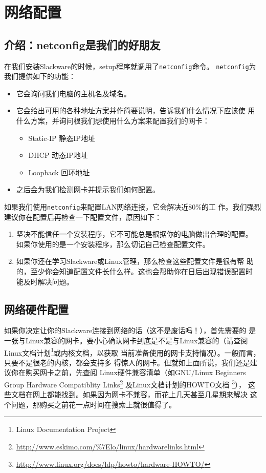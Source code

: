 
\chapter{网络配置}
\label{chap:networkConfiguration}

\section{介绍：netconfig是我们的好朋友}
\label{sec:networkConfiguration:netconfig}

在我们安装Slackware的时候，setup程序就调用了\texttt{netconfig}命令。
\texttt{netconfig}为我们提供如下的功能：
\begin{itemize}
\item 它会询问我们电脑的主机名及域名。
\item 它会给出可用的各种地址方案并作简要说明，告诉我们什么情况下应该使
  用什么方案，并询问根我们想使用什么方案来配置我们的网卡：
  \begin{itemize}
  \item Static-IP 静态IP地址
  \item DHCP 动态IP地址
  \item Loopback 回环地址
  \end{itemize}
\item 之后会为我们检测网卡并提示我们如何配置。
\end{itemize}
如果我们使用\texttt{netconfig}来配置LAN网络连接，它会解决近$80\%$的工
作。我们强烈建议你在配置后再检查一下配置文件，原因如下：
\begin{enumerate}
\item 坚决不能信任一个安装程序，它不可能总是根据你的电脑做出合理的配置。
  如果你使用的是一个安装程序，那么切记自己检查配置文件。
\item 如果你还在学习Slackware或Linux管理，那么检查这些配置文件是很有帮
  助的，至少你会知道配置文件长什么样。这也会帮助你在日后出现错误配置时
  能及时解决问题。
\end{enumerate}
                                

\section{网络硬件配置}
\label{sec:networkConfiguration:hardware}
如果你决定让你的Slackware连接到网络的话（这不是废话吗！），首先需要的
是一张与Linux兼容的网卡。要小心确认网卡到底是不是与Linux兼容的（请查阅
Linux文档计划\footnote{Linux Documentation Project}或内核文档，以获取
当前准备使用的网卡支持情况）。一般而言，只要不是很老的内核，都会支持多
得惊人的网卡。但就如上面所说，我们还是建议你在购买网卡之前，先查阅
Linux硬件兼容清单（如GNU/Linux Beginners Group Hardware Compatiblity
Links\footnote{\url{http://www.eskimo.com/\%7Elo/linux/hardwarelinks.html}}
及Linux文档计划的HOWTO文档
\footnote{\url{http://www.linux.org/docs/ldp/howto/hardware-HOWTO/}}），
这些文档在网上都能找到。如果因为网卡不兼容，而花上几天甚至几星期来解决
这个问题，那购买之前花一点时间在搜索上就很值得了。


